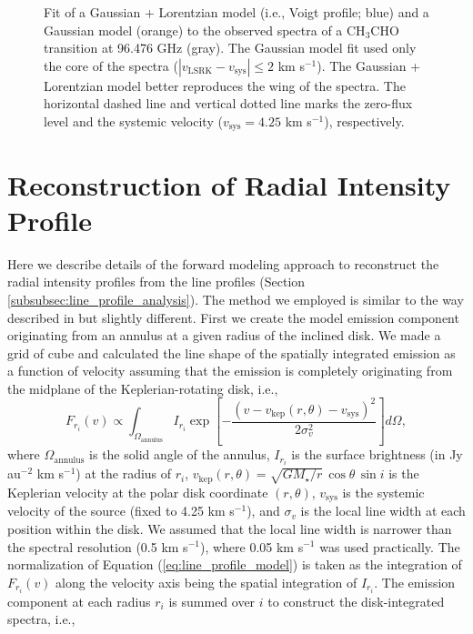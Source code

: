 \documentclass[linenumbers, twocolumn, twocolappendix, astrosymb, times]{aastex631}
\newcommand{\acetaldehyde}{CH$_3$CHO\xspace}
\begin{document}
\begin{figure}
\caption{Fit of a Gaussian + Lorentzian model (i.e., Voigt profile; blue) and a Gaussian model (orange) to the observed spectra of a \acetaldehyde transition at 96.476 GHz (gray). The Gaussian model fit used only the core of the spectra ($|v_\mathrm{LSRK} - v_\mathrm{sys}| \leq 2$ km s$^{-1}$). The Gaussian + Lorentzian model better reproduces the wing of the spectra. The horizontal dashed line and vertical dotted line marks the zero-flux level and the systemic velocity ($v_\mathrm{sys} = 4.25$ km s$^{-1}$), respectively.}
\label{fig:Lorentzian_demo}
\end{figure}

\section{Reconstruction of Radial Intensity Profile}\label{appendix:line_profile_analysis_method}
Here we describe details of the forward modeling approach to reconstruct the radial intensity profiles from the line profiles (Section \ref{subsubsec:line_profile_analysis}). The method we employed is similar to the way described in \citet{Bosman2021} but slightly different. First we create the model emission component originating from an annulus at a given radius of the inclined disk. We made a grid of cube and calculated the line shape of the spatially integrated emission as a function of velocity assuming that the emission is completely originating from the midplane of the Keplerian-rotating disk, i.e.,
\begin{equation}\label{eq:line_profile_model}
    F_{r_i}(v) \propto \int_{\Omega_\mathrm{annulus}}I_{r_i}\exp\left[- \frac{(v - v_\mathrm{kep}(r, \theta) - v_\mathrm{sys})^2}{2\sigma_v^2}\right]d\Omega,
\end{equation}
where $\Omega_\mathrm{annulus}$ is the solid angle of the annulus, $I_{r_i}$ is the surface brightness (in Jy au$^{-2}$ km s$^{-1}$) at the radius of $r_i$, $v_\mathrm{kep}(r, \theta) = \sqrt{GM_\star/r}\,\cos\theta\,\sin i$ is the Keplerian velocity at the polar disk coordinate $(r, \theta)$, $v_\mathrm{sys}$ is the systemic velocity of the source (fixed to 4.25 km s$^{-1}$), and $\sigma_v$ is the local line width at each position within the disk. We assumed that the local line width is narrower than the spectral resolution (0.5 km s$^{-1}$), where 0.05 km s$^{-1}$ was used practically. The normalization of Equation (\ref{eq:line_profile_model}) is taken as the integration of $F_{r_i}(v)$ along the velocity axis being the spatial integration of $I_{r_i}$. The emission component at each radius $r_i$ is summed over $i$ to construct the disk-integrated spectra, i.e., 
\end{document}
